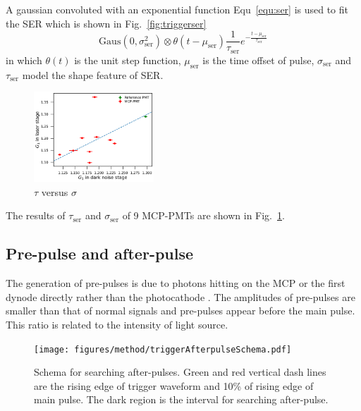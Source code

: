 A gaussian convoluted with an exponential function Equ~\eqref{equ:ser} is used to fit the SER which is shown in Fig.~\ref{fig:triggerser}
\begin{equation}
    \label{equ:ser}
    \mathrm{Gaus}(0,\sigma_{\mathrm{ser}}^2)\otimes\theta(t-\mu_{\mathrm{ser}})\frac{1}{\tau_{\mathrm{ser}}}e^{-\frac{t-\mu_{\mathrm{ser}}}{\tau_{\mathrm{ser}}}}
\end{equation}
in which $\theta(t)$ is the unit step function, $\mu_{\mathrm{ser}}$ is the time offset of pulse, $\sigma_{\mathrm{ser}}$ and $\tau_{\mathrm{ser}}$ model the shape feature of SER. 
\begin{figure}[!htbp]
    \centering
    \includegraphics[width=0.4\textwidth,page=12]{figures/result/compare.pdf}
    \caption{$\tau$ versus $\sigma$}
    \label{fig:sigmaCompare}
\end{figure}

The results of $\tau_{\mathrm{ser}}$ and $\sigma_{\mathrm{ser}}$ of 9 MCP-PMTs are shown in Fig.~\ref{fig:sigmaCompare}.

\subsection{Pre-pulse and after-pulse}
The generation of pre-pulses is due to photons hitting on the MCP or the first dynode directly rather than the photocathode \cite{JUNOMassTesting}. The amplitudes of pre-pulses are smaller than that of normal signals and  pre-pulses appear before the main pulse. This ratio is related to the intensity of light source.
\begin{figure}
    \centering
    \texttt{[image: figures/method/triggerAfterpulseSchema.pdf]}
    \caption{Schema for searching after-pulses. Green and red vertical dash lines are the rising edge of trigger waveform and 10\% of rising edge of main pulse. The dark region is the interval for searching after-pulse.}
    \label{fig:afterpulseSchema}
\end{figure}

